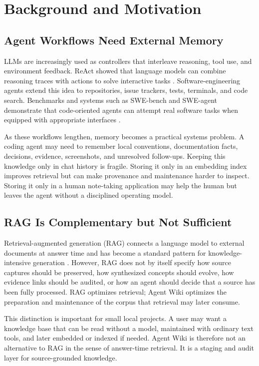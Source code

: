 \documentclass[11pt]{article}
\begin{document}
\section{Background and Motivation}

\subsection{Agent Workflows Need External Memory}

LLMs are increasingly used as controllers that interleave reasoning, tool use,
and environment feedback. ReAct showed that language models can combine
reasoning traces with actions to solve interactive tasks \cite{yao2023react}.
Software-engineering agents extend this idea to repositories, issue trackers,
tests, terminals, and code search. Benchmarks and systems such as SWE-bench and
SWE-agent demonstrate that code-oriented agents can attempt real software tasks
when equipped with appropriate interfaces \cite{jimenez2024swebench,
yang2024sweagent}.

As these workflows lengthen, memory becomes a practical systems problem. A
coding agent may need to remember local conventions, documentation facts,
decisions, evidence, screenshots, and unresolved follow-ups. Keeping this
knowledge only in chat history is fragile. Storing it only in an embedding
index improves retrieval but can make provenance and maintenance harder to
inspect. Storing it only in a human note-taking application may help the human
but leaves the agent without a disciplined operating model.

\subsection{RAG Is Complementary but Not Sufficient}

Retrieval-augmented generation (RAG) connects a language model to external
documents at answer time and has become a standard pattern for knowledge-
intensive generation \cite{lewis2020rag}. However, RAG does not by itself
specify how source captures should be preserved, how synthesized concepts
should evolve, how evidence links should be audited, or how an agent should
decide that a source has been fully processed. RAG optimizes retrieval; Agent
Wiki optimizes the preparation and maintenance of the corpus that retrieval may
later consume.

This distinction is important for small local projects. A user may want a
knowledge base that can be read without a model, maintained with ordinary text
tools, and later embedded or indexed if needed. Agent Wiki is therefore not an
alternative to RAG in the sense of answer-time retrieval. It is a staging and
audit layer for source-grounded knowledge.
\end{document}
